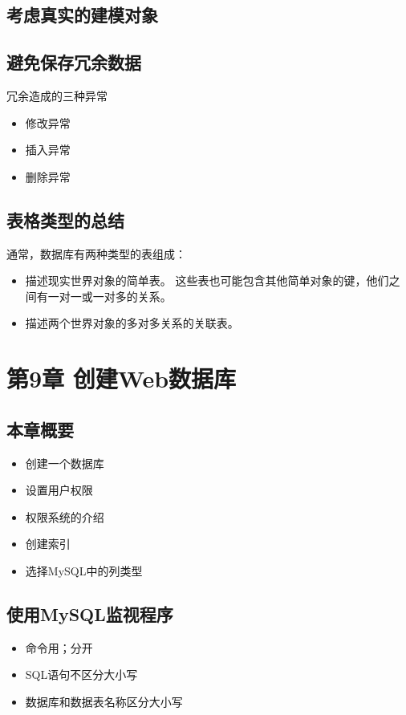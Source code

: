 \documentclass[11pt]{article}
\begin{document}
\subsection{考虑真实的建模对象}
\label{sec:org7857b23}
\subsection{避免保存冗余数据}
\label{sec:org4cece89}
冗余造成的三种异常
\begin{itemize}
\item 修改异常
\item 插入异常
\item 删除异常
\end{itemize}
\subsection{表格类型的总结}
\label{sec:org5b2e598}
通常，数据库有两种类型的表组成：
\begin{itemize}
\item 描述现实世界对象的简单表。  这些表也可能包含其他简单对象的键，他们之间有一对一或一对多的关系。
\item 描述两个世界对象的多对多关系的关联表。
\end{itemize}

\section{第9章 创建Web数据库}
\label{sec:orgf927394}
\subsection{本章概要}
\label{sec:org57ddbbf}
\begin{itemize}
\item 创建一个数据库
\item 设置用户权限
\item 权限系统的介绍
\item 创建索引
\item 选择MySQL中的列类型
\end{itemize}
\subsection{使用MySQL监视程序}
\label{sec:org6d60ccf}
\begin{itemize}
\item 命令用；分开
\item SQL语句不区分大小写
\item 数据库和数据表名称区分大小写
\end{itemize}
\end{document}

